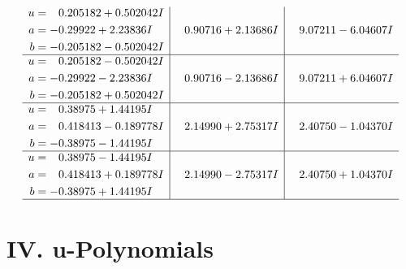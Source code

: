 \documentclass[1p]{elsarticle_modified}
\theoremstyle{definition}
\begin{document}
$$\begin{array}{c|c|c}
\begin{aligned}
u &= \phantom{-}0.205182 + 0.502042 I \\
a &= -0.29922 + 2.23836 I \\
b &= -0.205182 - 0.502042 I\end{aligned}
 & \phantom{-}0.90716 + 2.13686 I & \phantom{-}9.07211 - 6.04607 I \\ \hline\begin{aligned}
u &= \phantom{-}0.205182 - 0.502042 I \\
a &= -0.29922 - 2.23836 I \\
b &= -0.205182 + 0.502042 I\end{aligned}
 & \phantom{-}0.90716 - 2.13686 I & \phantom{-}9.07211 + 6.04607 I \\ \hline\begin{aligned}
u &= \phantom{-}0.38975 + 1.44195 I \\
a &= \phantom{-}0.418413 - 0.189778 I \\
b &= -0.38975 - 1.44195 I\end{aligned}
 & \phantom{-}2.14990 + 2.75317 I & \phantom{-}2.40750 - 1.04370 I \\ \hline\begin{aligned}
u &= \phantom{-}0.38975 - 1.44195 I \\
a &= \phantom{-}0.418413 + 0.189778 I \\
b &= -0.38975 + 1.44195 I\end{aligned}
 & \phantom{-}2.14990 - 2.75317 I & \phantom{-}2.40750 + 1.04370 I\\
 \hline 
 \end{array}$$\newpage
\newpage\renewcommand{\arraystretch}{1}
\centering \section*{ IV. u-Polynomials}
\end{document}
